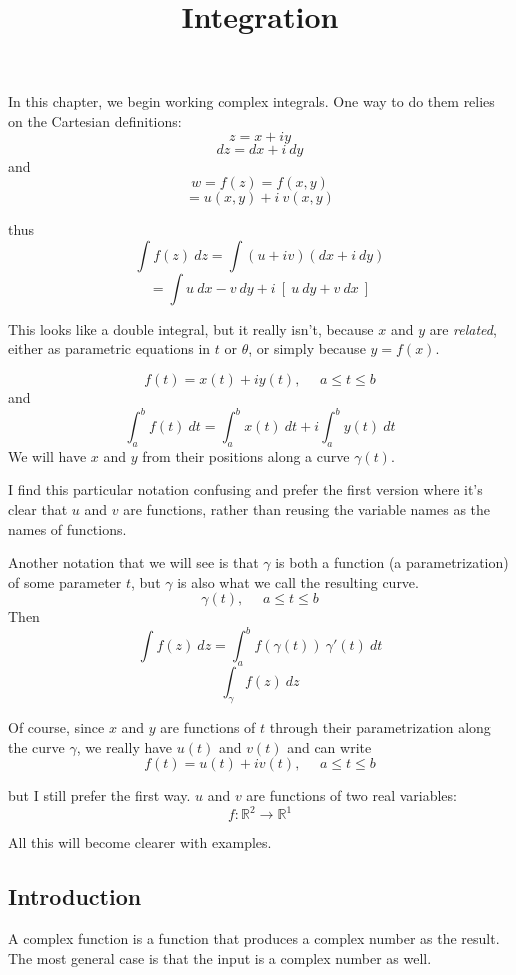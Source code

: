 \documentclass[11pt, oneside]{article}
\title{Integration}
\date{}
\begin{document}
\maketitle
\Large


In this chapter, we begin working complex integrals.  One way to do them relies on the Cartesian definitions:
\[ z = x + iy \]
\[ dz = dx + i \ dy \]
and
\[ w = f(z) = f(x,y) \]
\[ = u(x,y) + i \ v(x,y) \]

thus
\[ \int f(z) \ dz = \int (u + iv)(dx + i \ dy) \]
\[ = \int u \ dx - v \ dy + i \ [ \ u \ dy + v \ dx \ ] \]

This looks like a double integral, but it really isn't, because $x$ and $y$ are \emph{related}, either as parametric equations in $t$ or $\theta$, or simply because $y = f(x)$.

\[ f(t) = x(t) + iy(t), \ \ \ \ \ \ a \le t \le b \]
and
\[ \int_a^b f(t) \ dt = \int_a^b x(t) \ dt + i \int_a^b y(t) \ dt \]
We will have $x$ and $y$ from their positions along a curve $\gamma (t)$.

I find this particular notation confusing and prefer the first version where it's clear that $u$ and $v$ are functions, rather than reusing the variable names as the names of functions.  

Another notation that we will see is that $\gamma$ is both a function (a parametrization) of some parameter $t$, but $\gamma$ is also what we call the resulting curve.
\[ \gamma(t), \ \ \ \ \ \ a \le t \le b \]
Then
\[ \int f(z) \ dz = \int_a^b f(\gamma(t)) \ \gamma'(t) \ dt \]
\[ \int_\gamma f(z) \ dz \]

Of course, since $x$ and $y$ are functions of $t$ through their parametrization along the curve $\gamma$, we really have $u(t)$ and $v(t)$ and can write
\[ f(t) = u(t) + iv(t), \ \ \ \ \ \ a \le t \le b \]

but I still prefer the first way.  $u$ and $v$ are functions of two real variables:
\[ f: \mathbb{R}^2 \rightarrow \mathbb{R}^1 \]

All this will become clearer with examples.

\subsection*{Introduction}

A complex function is a function that produces a complex number as the result. The most general case is that the input is a complex number as well.  
\end{document}
